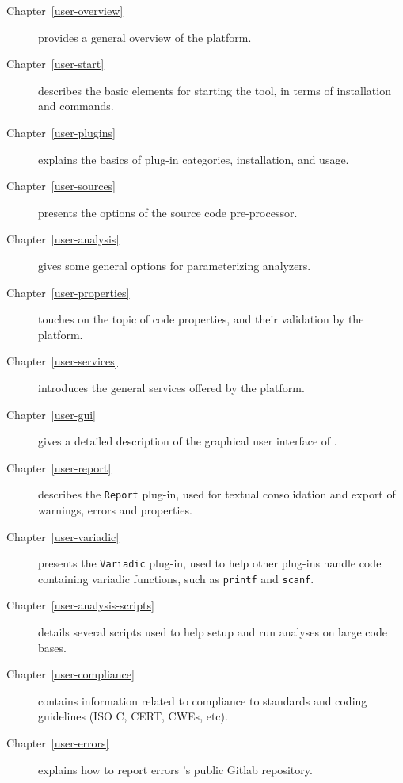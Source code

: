 \begin{description}
\item[Chapter~\ref{user-overview}] provides a general overview of the platform.
\item[Chapter~\ref{user-start}] describes the basic elements for starting the
  tool, in terms of installation and commands.
\item[Chapter~\ref{user-plugins}] explains the basics of plug-in categories,
  installation, and usage.
\item[Chapter~\ref{user-sources}] presents the options of the source code
  pre-processor.
\item[Chapter~\ref{user-analysis}] gives some general options for parameterizing
  analyzers.
\item[Chapter~\ref{user-properties}] touches on the topic of code properties,
  and their validation by the platform.
\item[Chapter~\ref{user-services}] introduces the general services offered by
  the platform.
\item[Chapter~\ref{user-gui}] gives a detailed description of the graphical
  user interface of \FramaC.
\item[Chapter~\ref{user-report}] describes the \texttt{Report} plug-in, used
  for textual consolidation and export of warnings, errors and properties.
\item[Chapter~\ref{user-variadic}] presents the \texttt{Variadic} plug-in,
  used to help other plug-ins handle code containing variadic functions, such
  as \texttt{printf} and \texttt{scanf}.
\item[Chapter~\ref{user-analysis-scripts}] details several scripts used to
  help setup and run analyses on large code bases.
\item[Chapter~\ref{user-compliance}] contains information related to compliance
  to standards and coding guidelines (ISO C, CERT, CWEs, etc).
\item[Chapter~\ref{user-errors}] explains how to report errors \via \FramaC's
  public Gitlab repository.
\end{description}
